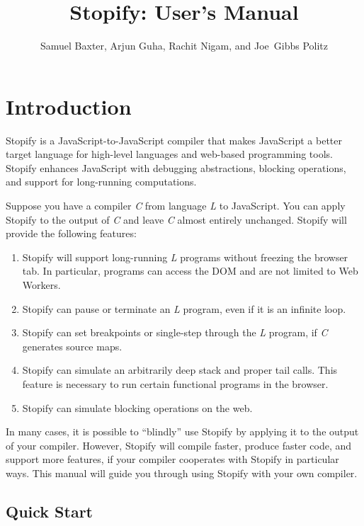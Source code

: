 \documentclass{book}
\title{Stopify: User's Manual}
\author{Samuel Baxter, Arjun Guha, Rachit Nigam, and Joe~Gibbs Politz}
\begin{document}
\maketitle
\tableofcontents

\chapter{Introduction}

Stopify is a JavaScript-to-JavaScript compiler that makes JavaScript a better
target language for high-level languages and web-based programming tools.
Stopify enhances JavaScript with debugging abstractions, blocking operations,
and support for long-running computations.

Suppose you have a compiler \emph{C} from language \emph{L} to JavaScript. You
can apply Stopify to the output of \emph{C} and leave \emph{C} almost entirely
unchanged. Stopify will provide the following features:

\begin{enumerate}

\item Stopify will support long-running \emph{L} programs without freezing the
browser tab. In particular, programs can access the DOM and are not limited to
Web Workers.

\item Stopify can pause or terminate an \emph{L} program, even if it is an
infinite loop.

\item Stopify can set breakpoints or single-step through the \emph{L} program,
if \emph{C} generates source maps.

\item Stopify can simulate an arbitrarily deep stack and proper tail calls.
This feature is necessary to run certain functional programs in the browser.

\item Stopify can simulate blocking operations on the web.

\end{enumerate}

In many cases, it is possible to ``blindly'' use Stopify by applying it to the
output of your compiler. However, Stopify will compile faster, produce faster
code, and support more features, if your compiler cooperates with Stopify in
particular ways. This manual will guide you through using Stopify with your own
compiler.

\section{Quick Start}
\end{document}
